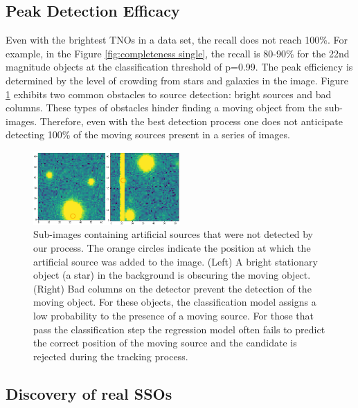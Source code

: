 \documentclass{aastex631}
\begin{document}
\subsection{Peak Detection Efficacy}
\label{subsect: Peak Detection Efficacy}

Even with the brightest TNOs in a data set, the recall does not reach 100\%.
For example, in the Figure \ref{fig:completeness single}, the recall is 80-90\% for the 22nd magnitude objects at the classification threshold of p=0.99.
The peak efficiency is determined by the level of crowding from stars and galaxies in the image.
Figure \ref{fig:obstacles} exhibits two common obstacles to source detection: bright sources and bad columns.
These types of obstacles hinder finding a moving object from the sub-images.
Therefore, even with the best detection process one does not anticipate detecting 100\% of the moving sources present in a series of images.

\begin{figure}[htb]
    \centering
    \includegraphics[width=0.5\textwidth,keepaspectratio]{Figures/obstacles.png}
    \caption{Sub-images containing artificial sources that were not detected by our process.
    The orange circles indicate the position at which the artificial source was added to the image.
    (Left) A bright stationary object (a star) in the background is obscuring the moving object.  
    (Right) Bad columns on the detector prevent the detection of the moving object.
    For these objects, the classification model assigns a low probability to the presence of a moving source.  
    For those that pass the classification step the regression model often fails to predict the correct position of the moving source and the candidate is rejected during the tracking process.
}
    \label{fig:obstacles}
\end{figure}

\subsection{Discovery of real SSOs}
\label{subsect:Discovery of real SSOs}
\end{document}
